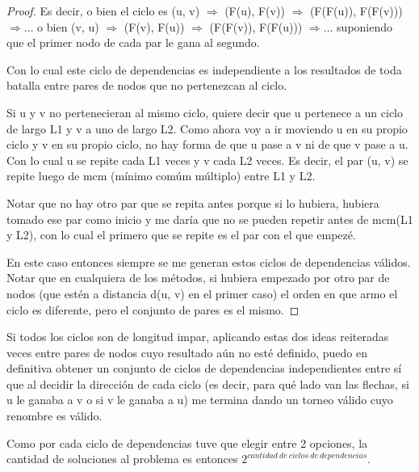 \begin{proof}
	Es decir, o bien el ciclo es (u, v) $\Rightarrow$ (F(u), F(v)) $\Rightarrow$ (F(F(u)), F(F(v))) $\Rightarrow \ldots$ o bien (v, u) $\Rightarrow$ (F(v), F(u)) $\Rightarrow$ (F(F(v)), F(F(u))) $\Rightarrow \ldots$ suponiendo que el primer nodo de cada par le gana al segundo. \newline

	Con lo cual este ciclo de dependencias es independiente a los resultados de toda batalla entre pares de nodos que no pertenezcan al ciclo. \newline 

	Si u y v no pertenecieran al mismo ciclo, quiere decir que u pertenece a un ciclo de largo L1 y v a uno de largo L2. Como ahora voy a ir moviendo u en su propio ciclo y v en su propio ciclo, no hay forma de que u pase a v ni de que v pase a u. Con lo cual u se repite cada L1 veces y v cada L2 veces. Es decir, el par (u, v) se repite luego de mcm (mínimo comúm múltiplo) entre L1 y L2. \newline

	Notar que no hay otro par que se repita antes porque si lo hubiera, hubiera tomado ese par como inicio y me daría que no se pueden repetir antes de mcm(L1 y L2), con lo cual el primero que se repite es el par con el que empezé. \newline

	En este caso entonces siempre se me generan estos ciclos de dependencias válidos. Notar que en cualquiera de los métodos, si hubiera empezado por otro par de nodos (que estén a distancia d(u, v) en el primer caso) el orden en que armo el ciclo es diferente, pero el conjunto de pares es el mismo.

\end{proof}

\begin{corollary}
	Si todos los ciclos son de longitud impar, aplicando estas dos ideas reiteradas veces entre pares de nodos cuyo resultado aún no esté definido, puedo en definitiva obtener un conjunto de ciclos de dependencias independientes entre sí que al decidir la dirección de cada ciclo (es decir, para qué lado van las flechas, si u le ganaba a v o si v le ganaba a u) me termina dando un torneo válido cuyo renombre es válido. \newline

	Como por cada ciclo de dependencias tuve que elegir entre 2 opciones, la cantidad de soluciones al problema es entonces $2^{cantidad\ de\ ciclos\ de\ dependencias}$.
\end{corollary}


